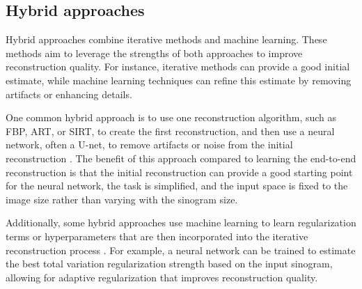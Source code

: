 \subsection{Hybrid approaches}
Hybrid approaches combine iterative methods and machine learning. These methods aim to leverage the strengths of both approaches to improve reconstruction quality. For instance, iterative methods can provide a good initial estimate, while machine learning techniques can refine this estimate by removing artifacts or enhancing details.

One common hybrid approach is to use one reconstruction algorithm, such as FBP, ART, or SIRT, to create the first reconstruction, and then use a neural network, often a U-net, to remove artifacts or noise from the initial reconstruction \cite{huang2020limited,xu2024hybrid,wang2020deep,arndt2023model}. The benefit of this approach compared to learning the end-to-end reconstruction is that the initial reconstruction can provide a good starting point for the neural network, the task is simplified, and the input space is fixed to the image size rather than varying with the sinogram size.

Additionally, some hybrid approaches use machine learning to learn regularization terms or hyperparameters that are then incorporated into the iterative reconstruction process \cite{kim2019extreme,shen2018intelligent}. For example, a neural network can be trained to estimate the best total variation regularization strength based on the input sinogram, allowing for adaptive regularization that improves reconstruction quality.